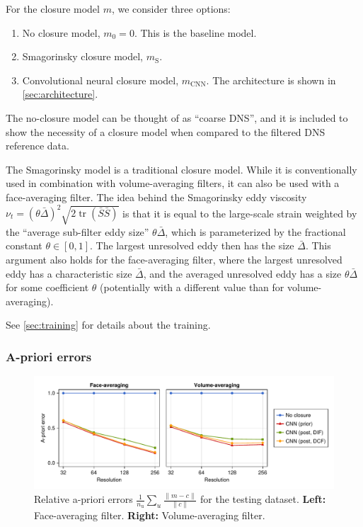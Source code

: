 \documentclass[preprint]{elsarticle}
\newcommand{\R}[1]{}
\newcommand{\revtwo}[1]{#1}
\newcommand{\revboth}[1]{#1}
\begin{document}
For the closure model $m$, we consider three options:
\begin{enumerate}
    \item No closure model, $m_0 = 0$. This is the baseline model.
    \item Smagorinsky closure model, $m_\text{S}$.
    \item Convolutional neural closure model, $m_\text{CNN}$.
        The architecture is shown in \ref{sec:architecture}.
\end{enumerate}
\revtwo{
    The no-closure model can be thought of as ``coarse DNS'', and it is included
    to show the necessity of a closure model when compared to the filtered DNS
    reference data.
    \R{smagorinsky-FA}
    The Smagorinsky model is a traditional closure model. While it is
    conventionally used in combination with volume-averaging filters, it can
    also be used with a face-averaging filter.
    The idea behind the Smagorinsky eddy viscosity
    $\nu_t = (\theta \bar{\Delta})^2 \sqrt{2 \operatorname{tr}(\bar{S} \bar{S})}$
    is that it is equal to the large-scale strain weighted by the
    ``average sub-filter eddy size'' $\theta \bar{\Delta}$,
    which is parameterized by the fractional constant $\theta \in [0, 1]$.
    The largest unresolved eddy then has the size $\bar{\Delta}$.
    This argument also holds for the face-averaging filter, where the largest
    unresolved eddy has a characteristic size $\bar{\Delta}$, and the averaged
    unresolved eddy has a size $\theta \bar{\Delta}$ for some coefficient
    $\theta$ (potentially with a different value than for volume-averaging).
}
See \ref{sec:training} for details about the training.

\subsubsection{A-priori errors}

\begin{figure}
    \centering
    \includegraphics[width=\textwidth]{figures_kolmogorov_eprior.pdf}
    \caption{
        \revboth{Relative} a-priori errors
        $\frac{1}{n_\text{u}} \sum_u \frac{\| m - c \|}{\| c \|}$
        for the testing dataset.
        \textbf{Left:} Face-averaging filter.
        \textbf{Right:} Volume-averaging filter.
    }
    \label{fig:convergence_prior}
\end{figure}
\end{document}
